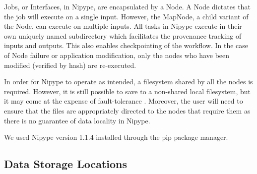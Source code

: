 \documentclass{IEEEtran}
\newcommand{\todo}[1]{\marginpar{\parbox{18mm}{\flushleft\tiny\color{red}\textbf{TODO}:
      #1}}}
\begin{document}
Jobs, or Interfaces, in Nipype, are encapsulated by a Node. A Node dictates that
the job will execute on a single input. However, the MapNode, 
a child variant of the Node, can execute on multiple inputs. All tasks in
Nipype execute in their own uniquely named subdirectory which facilitates the provenance 
tracking of inputs and outputs. This also enables checkpointing of the workflow.
In the case of Node failure or application modification, only the nodes who have
been modified (verified by hash) are re-executed.

In order for Nipype to operate as intended, a filesystem shared by all the nodes 
is required. However, it is still possible to save to a non-shared local filesystem, 
but it may come at the expense of fault-tolerance \todo{explain why}. Moreover, the user will need to
ensure that the files are appropriately directed to the nodes that require them as
there is no guarantee of data locality in Nipype.

We used Nipype version 1.1.4 installed through the pip package manager.


\subsection{Data Storage Locations}
\end{document}
